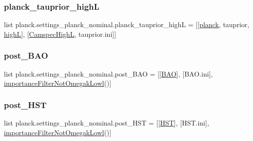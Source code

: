 \subsubsection{\texorpdfstring{planck\+\_\+tauprior\+\_\+highL}{planck\_tauprior\_highL}}
{\footnotesize\ttfamily list planck.\+settings\+\_\+planck\+\_\+nominal.\+planck\+\_\+tauprior\+\_\+highL = \mbox{[}\mbox{[}\mbox{\hyperlink{namespaceplanck_1_1settings__planck__nominal_a6f1ef8e232b47d87b6d83ec17c539b60}{planck}}, \textquotesingle{}tauprior\textquotesingle{}, \mbox{\hyperlink{namespaceplanck_1_1settings__planck__nominal_a2149979f1abc79475e000b828812fafb}{highL}}\mbox{]}, \mbox{[}\mbox{\hyperlink{namespaceplanck_1_1settings__planck__nominal_aa2ae616c3b4aa7481497a1ee554915b8}{Camspec\+HighL}}, \textquotesingle{}tauprior.\+ini\textquotesingle{}\mbox{]}\mbox{]}}

\mbox{\label{namespaceplanck_1_1settings__planck__nominal_aa01d97596bf56fc5158fc747690164e1}} 
\subsubsection{\texorpdfstring{post\+\_\+\+B\+AO}{post\_BAO}}
{\footnotesize\ttfamily list planck.\+settings\+\_\+planck\+\_\+nominal.\+post\+\_\+\+B\+AO = \mbox{[}\mbox{[}\mbox{\hyperlink{namespaceplanck_1_1settings__planck__nominal_adb348a01bf054af06b580f1735df8de2}{B\+AO}}\mbox{]}, \mbox{[}\textquotesingle{}B\+A\+O.\+ini\textquotesingle{}\mbox{]}, \mbox{\hyperlink{classplanck_1_1settings__planck__nominal_1_1importanceFilterNotOmegakLowl}{importance\+Filter\+Not\+Omegak\+Lowl}}()\mbox{]}}

\mbox{\label{namespaceplanck_1_1settings__planck__nominal_aa5bad6a0c5c75f4926b9fcd5f29e5f35}} 
\subsubsection{\texorpdfstring{post\+\_\+\+H\+ST}{post\_HST}}
{\footnotesize\ttfamily list planck.\+settings\+\_\+planck\+\_\+nominal.\+post\+\_\+\+H\+ST = \mbox{[}\mbox{[}\mbox{\hyperlink{namespaceplanck_1_1settings__planck__nominal_a0a9ee49b7e265201d4d045005f10c8ff}{H\+ST}}\mbox{]}, \mbox{[}\textquotesingle{}H\+S\+T.\+ini\textquotesingle{}\mbox{]}, \mbox{\hyperlink{classplanck_1_1settings__planck__nominal_1_1importanceFilterNotOmegakLowl}{importance\+Filter\+Not\+Omegak\+Lowl}}()\mbox{]}}

